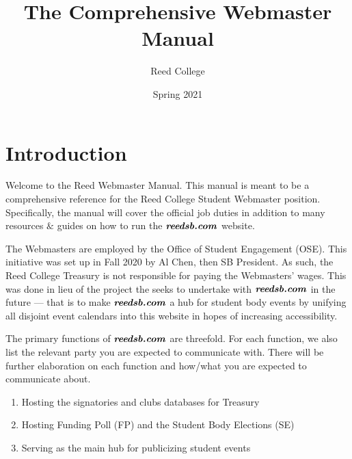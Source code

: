 \documentclass[a4paper]{article}
\title{The Comprehensive Webmaster Manual}
\author{Reed College}
\date{Spring 2021}
\begin{document}
\maketitle


\section{Introduction}

Welcome to the Reed Webmaster Manual. This manual is meant to be a comprehensive reference for the Reed College Student Webmaster position. Specifically, the manual will cover the official job duties in addition to many resources $\&$ guides on how to run the $\textbf{\textit{reedsb.com}}$ website.

\begin{note*}
  The Webmasters are employed by the Office of Student Engagement (OSE). This initiative was set up in Fall 2020 by Al Chen, then SB President. As such, the Reed College Treasury is not responsible for paying the Webmasters' wages. This was done in lieu of the project the \OSE seeks to undertake with $\textbf{\textit{reedsb.com}}$ in the future --- that is to make $\textbf{\textit{reedsb.com}}$ a hub for student body events by unifying all disjoint event calendars into this website in hopes of increasing accessibility.
\end{note*}


The primary functions of $\textbf{\textit{reedsb.com}}$ are threefold. For each function, we also list the relevant party you are expected to communicate with. There will be further elaboration on each function and how/what you are expected to communicate about.
\begin{enumerate}
\item Hosting the signatories and clubs databases for Treasury \\
\item Hosting Funding Poll (FP) and the Student Body Elections (SE) \\
\item Serving as the main hub for publicizing student events \\
\end{enumerate}
\end{document}
